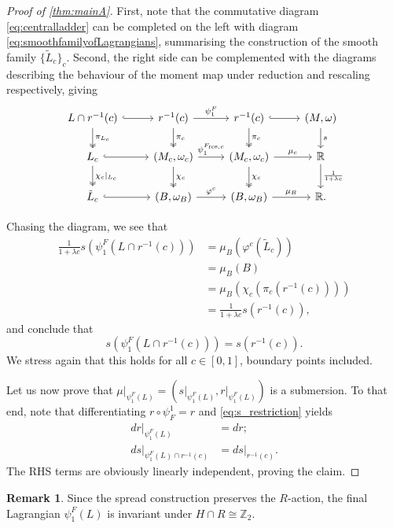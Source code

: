 \documentclass[10pt,oneside,reqno]{amsart}
\theoremstyle{definition}
\newtheorem*{remark}{Remark}
\newcommand{\IR}{\mathbb{R}}
\newcommand{\IZ}{\mathbb{Z}}
\newcommand{\resc}{{\textup{res},c}}
\begin{document}
\begin{proof}[Proof of \cref{thm:mainA}]
First, note that the commutative diagram \eqref{eq:centralladder} can be completed on the left with diagram \eqref{eq:smoothfamilyofLagrangians}, summarising the construction of the smooth family $\{\tilde{L}_c\}_c$. Second, the right side can be complemented with the diagrams describing the behaviour of the moment map under reduction and rescaling respectively, giving
\begin{equation*}
    \begin{tikzcd}
        L\cap r^{-1}(c) \arrow[r, hook] \arrow[d, "\pi_{L_c}", two heads] & r^{-1}(c) \arrow[r, "\psi^F_1"] \arrow[d, "\pi_c", two heads]      & r^{-1}(c) \arrow[r, hook] \arrow[d, "\pi_c", two heads] & {(M,\omega)} \arrow[d, "s"]            \\
        L_c \arrow[r, hook] \arrow[d, "\chi_c\vert_{L_c}",two heads]                & {(M_c,\omega_c)} \arrow[r, "\psi^{F_\resc}_1"] \arrow[d, "\chi_c",two heads] & {(M_c,\omega_c)} \arrow[r, "\mu_c"] \arrow[d, "\chi_c", two heads] & \IR \arrow[d, "\frac{1}{1+\lambda c}"] \\
        {\tilde{L}_c} \arrow[r, hook]                                         & {(B,\omega_B)} \arrow[r, "\varphi^c"]                              & {(B,\omega_B)} \arrow[r, "\mu_B"]                       & \IR.                                   
    \end{tikzcd}
    \end{equation*}

Chasing the diagram, we see that
\begin{align*}
    \frac{1}{1+\lambda c} s\left( \psi_1^F(L\cap r^{-1}(c))\right) &= \mu_B(\varphi^c(\tilde{L}_c)) \\
    &= \mu_B(B) \\
    &= \mu_B(\chi_c(\pi_c(r^{-1}(c)))) \\
    &= \frac{1}{1+\lambda c}s(r^{-1}(c)),
\end{align*}
and conclude that
\begin{equation}
    \label{eq:s_restriction}
    s(\psi^F_1(L\cap r^{-1}(c))) = s(r^{-1}(c)).
\end{equation}
We stress again that this holds for all $c \in [0,1]$, boundary points included.

Let us now prove that $\mu\vert_{\psi_1^F(L)} = (s\vert_{\psi_1^F(L)},r\vert_{\psi_1^F(L)})$ is a submersion. To that end, note that differentiating $r \circ \psi_F^1 = r$ and \eqref{eq:s_restriction} yields
\begin{align*}
    dr\vert_{\psi_1^F(L)} &= dr ;\\
    ds\vert_{\psi_1^F(L) \cap r^{-1}(c)} &= ds\vert_{r^{-1}(c)}.
\end{align*}
The RHS terms are obviously linearly independent, proving the claim.
\end{proof}
\begin{remark}
    Since the spread construction preserves the $R$-action, the final Lagrangian $\psi_ 1^F(L)$ is invariant under $H\cap R\cong \IZ_2.$
\end{remark}
\end{document}
